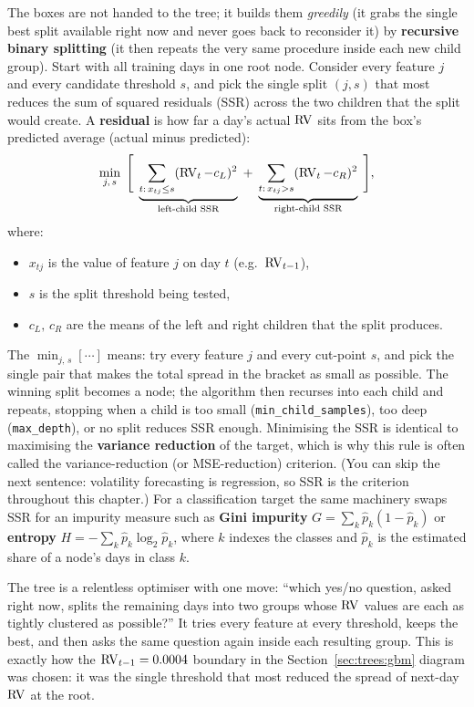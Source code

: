 The boxes are not handed to the tree; it builds them \emph{greedily} (it
grabs the single best split available right now and never goes back to
reconsider it) by \textbf{recursive binary splitting} (it then repeats the
very same procedure inside each new child group).  Start with all training
days in one root node.  Consider every feature $j$ and every candidate
threshold $s$, and pick the single split $(j, s)$ that most reduces the sum
of squared residuals (SSR) across the two children that the split would
create.  A \textbf{residual} is how far a day's actual $\operatorname{RV}$ sits from the
box's predicted average (actual minus predicted):
\begin{equation}\label{eq:trees:cart_split}
  \min_{j,\,s}\;
  \Bigg[\;
  \underbrace{\sum_{t:\,x_{tj}\le s}(\operatorname{RV}_t - c_L)^2}_{\text{left-child SSR}}
  \;+\;
  \underbrace{\sum_{t:\,x_{tj}> s}(\operatorname{RV}_t - c_R)^2}_{\text{right-child SSR}}
  \;\Bigg],
\end{equation}
where:
\begin{itemize}[leftmargin=1.8em]
  \item $x_{tj}$ is the value of feature $j$ on day $t$ (e.g.\ $\operatorname{RV}_{t-1}$),
  \item $s$ is the split threshold being tested,
  \item $c_L,\,c_R$ are the means of the left and right children that the
        split produces.
\end{itemize}
The $\min_{j,\,s}[\cdots]$ means: try every feature $j$ and every cut-point
$s$, and pick the single pair that makes the total spread in the bracket as
small as possible.  The winning split becomes a node; the algorithm then recurses into each
child and repeats, stopping when a child is too small
(\texttt{min\_child\_samples}), too deep (\texttt{max\_depth}), or no split
reduces SSR enough.  Minimising the SSR is identical to maximising the
\textbf{variance reduction} of the target, which is why this rule is often
called the variance-reduction (or MSE-reduction) criterion.  (You can skip
the next sentence: volatility forecasting is regression, so SSR is the
criterion throughout this chapter.)  For a classification target the same
machinery swaps SSR for an impurity measure such as \textbf{Gini impurity}
$G = \sum_k \hat{p}_k(1-\hat{p}_k)$ or \textbf{entropy}
$H = -\sum_k \hat{p}_k \log_2 \hat{p}_k$, where $k$ indexes the classes and
$\hat{p}_k$ is the estimated share of a node's days in class $k$.

\begin{intuition}
The tree is a relentless optimiser with one move: ``which yes/no question,
asked right now, splits the remaining days into two groups whose $\operatorname{RV}$
values are each as tightly clustered as possible?''  It tries every feature
at every threshold, keeps the best, and then asks the same question again
inside each resulting group.  This is exactly how the
$\operatorname{RV}_{t-1} = 0.0004$ boundary in the Section~\ref{sec:trees:gbm} diagram was
chosen: it was the single threshold that most reduced the spread of next-day
$\operatorname{RV}$ at the root.
\end{intuition}


